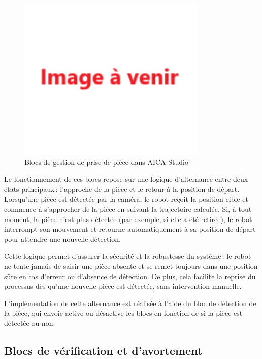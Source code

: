 \begin{figure}[H]
    \centering
    \includegraphics[width=0.8\textwidth]{assets/figures/img_a_venir.png}
    \caption{Blocs de gestion de prise de pièce dans AICA Studio}
    \label{fig:piece_block}
\end{figure}


Le fonctionnement de ces blocs repose sur une logique d'alternance entre deux états principaux : l'approche de la pièce et le retour à la position de départ. Lorsqu'une pièce est détectée par la caméra, le robot reçoit la position cible et commence à s'approcher de la pièce en suivant la trajectoire calculée. Si, à tout moment, la pièce n'est plus détectée (par exemple, si elle a été retirée), le robot interrompt son mouvement et retourne automatiquement à sa position de départ pour attendre une nouvelle détection.

Cette logique permet d'assurer la sécurité et la robustesse du système : le robot ne tente jamais de saisir une pièce absente et se remet toujours dans une position sûre en cas d'erreur ou d'absence de détection. De plus, cela facilite la reprise du processus dès qu'une nouvelle pièce est détectée, sans intervention manuelle.

L'implémentation de cette alternance est réalisée à l'aide du bloc de détection de la pièce, qui envoie active ou désactive les blocs en fonction de si la pièce est détectée ou non.


\subsection{Blocs de vérification et d'avortement}

